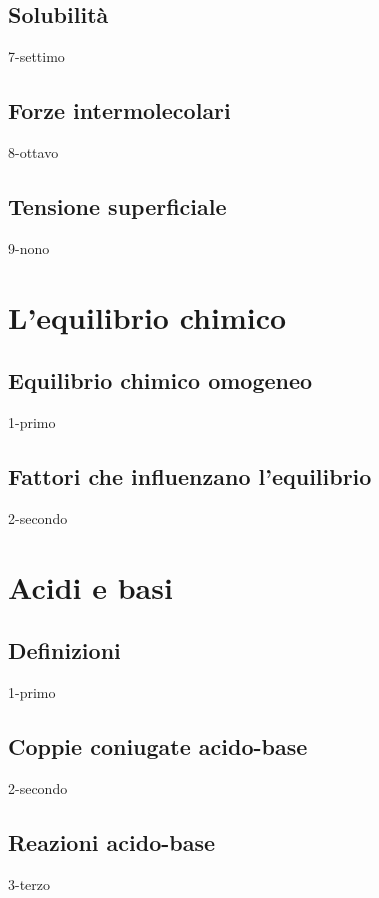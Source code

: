 \documentclass[openany,12pt]{book}%
\begin{document}
    \newpage

  \section{Solubilità}
    {7-settimo}

    \newpage

  \section{Forze intermolecolari}
    {8-ottavo}

  \section{Tensione superficiale}
    {9-nono}

\chapter{L'equilibrio chimico}

  \section{Equilibrio chimico omogeneo}
    {1-primo}

  \section{Fattori che influenzano l'equilibrio}
    {2-secondo}

\chapter{Acidi e basi}

  \section{Definizioni}
    {1-primo}

  \section{Coppie coniugate acido-base}
    {2-secondo}

  \section{Reazioni acido-base}
    {3-terzo}
\end{document}
